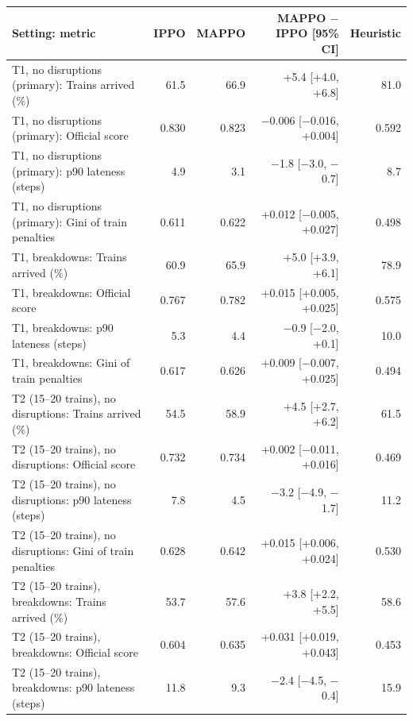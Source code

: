 \begin{tabular}{lrrrr}
\toprule
Setting: metric & IPPO & MAPPO & MAPPO $-$ IPPO [95\% CI] & Heuristic \\
\midrule
T1, no disruptions (primary): Trains arrived (\%) & 61.5 & 66.9 & +5.4 [+4.0, +6.8] & 81.0 \\
T1, no disruptions (primary): Official score & 0.830 & 0.823 & $-$0.006 [$-$0.016, +0.004] & 0.592 \\
T1, no disruptions (primary): p90 lateness (steps) & 4.9 & 3.1 & $-$1.8 [$-$3.0, $-$0.7] & 8.7 \\
T1, no disruptions (primary): Gini of train penalties & 0.611 & 0.622 & +0.012 [$-$0.005, +0.027] & 0.498 \\
T1, breakdowns: Trains arrived (\%) & 60.9 & 65.9 & +5.0 [+3.9, +6.1] & 78.9 \\
T1, breakdowns: Official score & 0.767 & 0.782 & +0.015 [+0.005, +0.025] & 0.575 \\
T1, breakdowns: p90 lateness (steps) & 5.3 & 4.4 & $-$0.9 [$-$2.0, +0.1] & 10.0 \\
T1, breakdowns: Gini of train penalties & 0.617 & 0.626 & +0.009 [$-$0.007, +0.025] & 0.494 \\
T2 (15–20 trains), no disruptions: Trains arrived (\%) & 54.5 & 58.9 & +4.5 [+2.7, +6.2] & 61.5 \\
T2 (15–20 trains), no disruptions: Official score & 0.732 & 0.734 & +0.002 [$-$0.011, +0.016] & 0.469 \\
T2 (15–20 trains), no disruptions: p90 lateness (steps) & 7.8 & 4.5 & $-$3.2 [$-$4.9, $-$1.7] & 11.2 \\
T2 (15–20 trains), no disruptions: Gini of train penalties & 0.628 & 0.642 & +0.015 [+0.006, +0.024] & 0.530 \\
T2 (15–20 trains), breakdowns: Trains arrived (\%) & 53.7 & 57.6 & +3.8 [+2.2, +5.5] & 58.6 \\
T2 (15–20 trains), breakdowns: Official score & 0.604 & 0.635 & +0.031 [+0.019, +0.043] & 0.453 \\
T2 (15–20 trains), breakdowns: p90 lateness (steps) & 11.8 & 9.3 & $-$2.4 [$-$4.5, $-$0.4] & 15.9 \\

\end{tabular}
